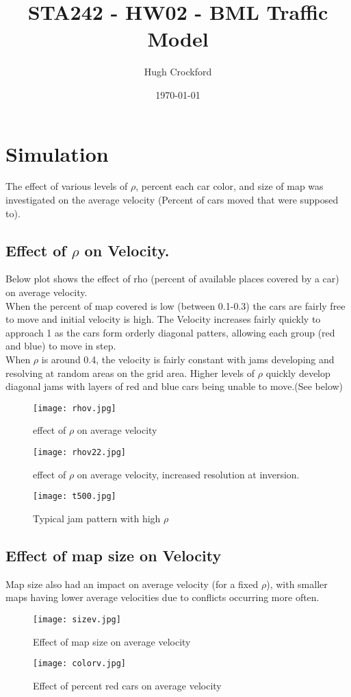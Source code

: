 \documentclass[12pt]{article}
\title{STA242 - HW02 - BML Traffic Model}
\author{Hugh Crockford}
\date{\today}
\begin{document}
	\maketitle
	\section{Simulation}
		The effect of various levels of \(\rho\), percent each car color, and size of map was investigated on the average velocity (Percent of cars moved that were supposed to).
		\subsection{Effect of \(\rho\) on Velocity.}
			Below plot shows the effect of rho (percent of available places covered by a car) on average velocity.\\
			When the percent of map covered is low (between 0.1-0.3) the cars are fairly free to move and initial velocity is high. The Velocity increases fairly quickly to approach 1 as the cars form orderly diagonal patters, allowing each group (red and blue) to move in step.\\
			When \(\rho\) is around 0.4, the velocity is fairly constant with jams developing and resolving at random areas on the grid area.
			Higher levels of \(\rho\) quickly develop diagonal jams with layers of red and blue cars being unable to move.(See below)
			\begin{figure}[h!b]
				\centering
				\texttt{[image: rhov.jpg]}
				\caption{effect of \(\rho\) on average velocity}
				\texttt{[image: rhov22.jpg]}
				\caption{effect of \(\rho\) on average velocity, increased resolution at inversion.}
			\end{figure}

			\begin{figure}
				\centering
				\texttt{[image: t500.jpg]}	%
				\caption{Typical jam pattern with high \(\rho\) }
			\end{figure}
			\subsection{Effect of map size on Velocity}
			Map size also had an impact on average velocity (for a fixed \(\rho\)), with smaller maps having lower average velocities due to conflicts occurring more often.

			\begin{figure}[hb!]
				\centering
				\texttt{[image: sizev.jpg]}
				\caption{Effect of map size on average velocity}
				\texttt{[image: colorv.jpg]}
				\caption{Effect of percent red cars on average velocity}
			\end{figure}
\end{document}
